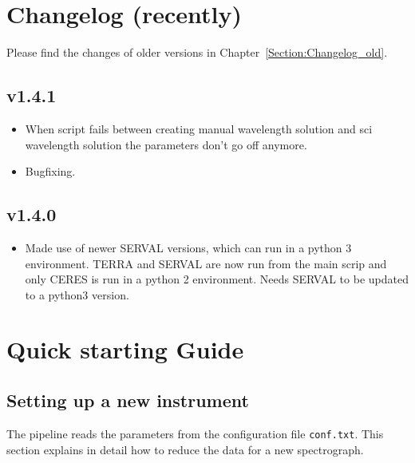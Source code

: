 \documentclass[10pt,a4paper]{article}
\begin{document}
\newpage

\section{Changelog (recently)}
\label{Section:Changelog_new}
Please find the changes of older versions in Chapter~\ref{Section:Changelog_old}.

\subsection*{v1.4.1}
\begin{itemize}\setlength\itemsep{0em}
  \item When script fails between creating manual wavelength solution and sci wavelength solution the parameters don't go off anymore.
  \item Bugfixing.
\end{itemize}

\subsection*{v1.4.0}
\begin{itemize}\setlength\itemsep{0em}
  \item Made use of newer SERVAL versions, which can run in a python 3 environment. TERRA and SERVAL are now run from the main scrip and only CERES is run in a python 2 environment. Needs SERVAL to be updated to a python3 version.
\end{itemize}


\section{Quick starting Guide}

\subsection{Setting up a new instrument}
\label{Section:first_configuration}
The pipeline reads the parameters from the configuration file \verb|conf.txt|. This section explains in detail how to reduce the data for a new spectrograph.
\end{document}
